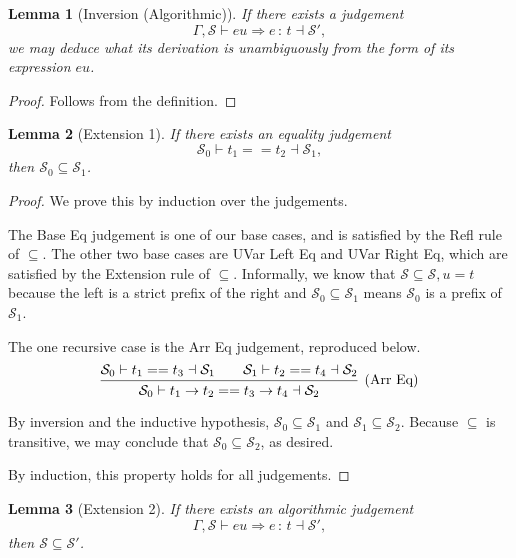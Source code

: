 \documentclass{article}
\newtheorem{lemma}{Lemma}
\newcommand{\G}{\Gamma}
\newcommand{\St}{\mathcal{S}}
\newcommand{\tp}{t}
\newcommand{\uv}{u}
\newcommand{\eu}{eu}
\newcommand{\e}{e}
\newcommand{\spc}{\qquad}
\newcommand{\eq}{==}
\renewcommand{\implies}{\Rightarrow}
\newcommand{\withtp}[2]{{#1} \,:\, {#2}}
\newcommand{\arr}[2]{{#1} \to {#2}}
\newcommand{\algtp}[6]{#1, #2 \vdash #3 \implies {\withtp {#4} {#5}} \dashv #6}
\newcommand{\equals}[4]{{#1} \vdash {#2} \eq {#3} \dashv {#4}}
\newcommand{\deduct}[3][]
{
  \begin{prooftree}
    \hypo{#2}
    \infer1[\text{#1}]{#3}
  \end{prooftree}
}
\begin{document}
\begin{lemma}[Inversion (Algorithmic)]
  If there exists a judgement
  \[ \algtp \G \St \eu \e \tp \St',\]
  we may deduce what its derivation is unambiguously from the form of
  its expression \(\eu\).
\end{lemma}

\begin{proof}
  Follows from the definition.
\end{proof}

\begin{lemma}[Extension 1]
  If there exists an equality judgement
  \[ \equals {\St_0} {\tp_1} {\tp_2} {\St_1}, \]
  then \(\St_0 \subseteq \St_1\).
\end{lemma}

\begin{proof}
  We prove this by induction over the judgements.

  The Base Eq judgement is one of our base cases, and is satisfied by the Refl
  rule of \(\subseteq\). The other two base cases are UVar Left Eq and UVar
  Right Eq, which are satisfied by the Extension rule of \(\subseteq\).
  Informally, we know that \(\St \subseteq \St, \uv = \tp\) because the left is
  a strict prefix of the right and \(\St_0 \subseteq \St_1\) means \(\St_0\) is
  a prefix of \(\St_1\).

  The one recursive case is the Arr Eq judgement, reproduced below.
  \[
  \deduct
  {\equals {\St_0} {\tp_1} {\tp_3} {\St_1} \spc
   \equals {\St_1} {\tp_2} {\tp_4} {\St_2}}
  {\equals {\St_0} {\arr {\tp_1} {\tp_2}} {\arr {\tp_3} {\tp_4}} {\St_2}}
  {\text{(Arr Eq)}}
  \]

  By inversion and the inductive hypothesis, \(\St_0 \subseteq \St_1\) and
  \(\St_1 \subseteq \St_2\). Because \(\subseteq\) is transitive, we may
  conclude that \(\St_0 \subseteq \St_2\), as desired.

  By induction, this property holds for all judgements.
\end{proof}

\begin{lemma}[Extension 2]
  If there exists an algorithmic judgement
  \[ \algtp \G \St \eu \e \tp \St', \]
  then \(\St \subseteq \St'\).
\end{lemma}
\end{document}
